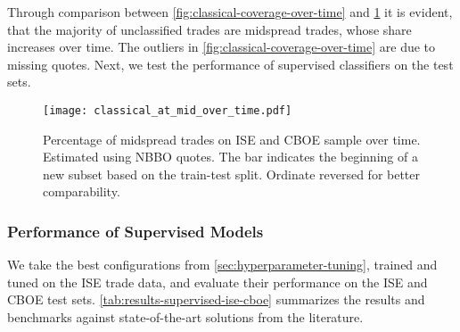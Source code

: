 Through comparison between \cref{fig:classical-coverage-over-time} and \cref{fig:classical-at-mid-over-time} it is evident, that the majority of unclassified trades are midspread trades, whose share increases over time. The outliers in \cref{fig:classical-coverage-over-time} are due to missing quotes.
Next, we test the performance of supervised classifiers on the test sets.

\begin{figure}[!h]
    \centering
    \texttt{[image: classical\_at\_mid\_over\_time.pdf]}
    \caption[Midspread Trades Over Time]{Percentage of midspread trades on \gls{ISE} and \gls{CBOE} sample over time. Estimated using \gls{NBBO} quotes. The bar \myline{} indicates the beginning of a new subset based on the train-test split. Ordinate reversed for better comparability.}
    \label{fig:classical-at-mid-over-time}
\end{figure}

\subsubsection{Performance of Supervised
    Models}\label{sec:results-of-supervised-models}

We take the best configurations from \cref{sec:hyperparameter-tuning}, trained and tuned on the \gls{ISE} trade data, and evaluate their performance on the \gls{ISE} and \gls{CBOE} test sets. \cref{tab:results-supervised-ise-cboe} summarizes the results and benchmarks against state-of-the-art solutions from the literature.

